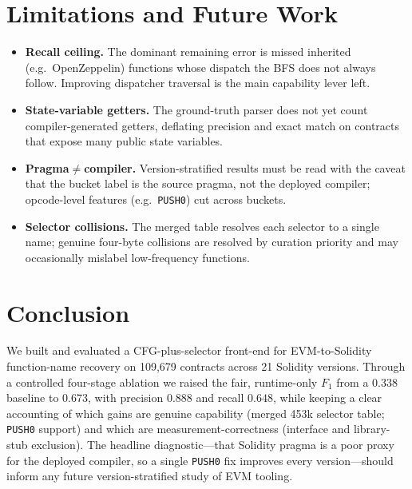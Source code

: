 \documentclass[10pt,conference]{article}
\begin{document}
\section{Limitations and Future Work}

\begin{itemize}
  \item \textbf{Recall ceiling.} The dominant remaining error is missed inherited
        (e.g.\ OpenZeppelin) functions whose dispatch the BFS does not always
        follow. Improving dispatcher traversal is the main capability lever left.
  \item \textbf{State-variable getters.} The ground-truth parser does not yet
        count compiler-generated getters, deflating precision and exact match on
        contracts that expose many public state variables.
  \item \textbf{Pragma$\neq$compiler.} Version-stratified results must be read
        with the caveat that the bucket label is the source pragma, not the
        deployed compiler; opcode-level features (e.g.\ \texttt{PUSH0}) cut across
        buckets.
  \item \textbf{Selector collisions.} The merged table resolves each selector to
        a single name; genuine four-byte collisions are resolved by curation
        priority and may occasionally mislabel low-frequency functions.
\end{itemize}

\section{Conclusion}

We built and evaluated a CFG-plus-selector front-end for EVM-to-Solidity
function-name recovery on 109{,}679 contracts across 21 Solidity versions.
Through a controlled four-stage ablation we raised the fair, runtime-only
$F_1$ from a $0.338$ baseline to $0.673$, with precision $0.888$ and recall
$0.648$, while keeping a clear accounting of which gains are genuine capability
(merged 453k selector table; \texttt{PUSH0} support) and which are
measurement-correctness (interface and library-stub exclusion). The headline
diagnostic---that Solidity pragma is a poor proxy for the deployed compiler, so a
single \texttt{PUSH0} fix improves every version---should inform any future
version-stratified study of EVM tooling.
\end{document}
